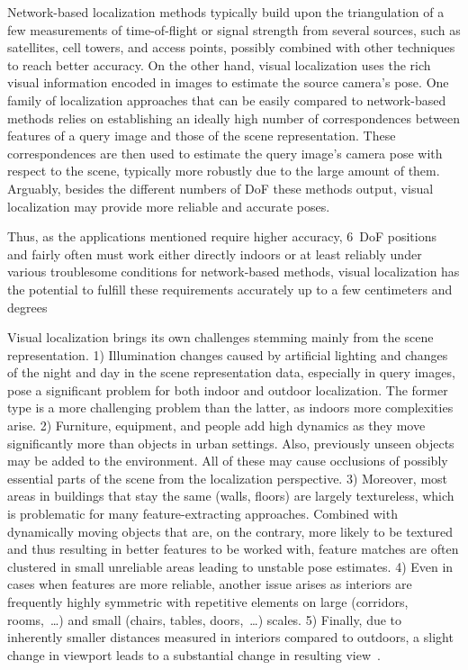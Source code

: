 Network-based localization methods typically build upon the triangulation of a few measurements
of time-of-flight or signal strength from several sources, such as satellites, cell towers,
and access points, possibly combined with other techniques to reach better accuracy.
On the other hand, visual localization uses the rich visual information encoded in images to
estimate the source camera's pose. One family of localization approaches that can be easily compared to
network-based methods relies on establishing an ideally high number of correspondences between
features of a query image and those of the scene representation. These correspondences are then
used to estimate the query image's camera pose with respect to the scene, typically more robustly
due to the large amount of them. Arguably, besides the different numbers of DoF these methods output,
visual localization may provide more reliable and accurate poses.

Thus, as the applications mentioned require higher accuracy, 6~DoF positions and fairly often
must work either directly indoors or at least reliably under various troublesome conditions for
network-based methods, visual localization has the potential to fulfill these
requirements accurately up to a few centimeters and
degrees

Visual localization brings its own challenges stemming mainly from the scene representation.
1) Illumination changes caused by artificial lighting and changes of the night and day
in the scene representation data, especially in query images, pose a significant problem
for both indoor and outdoor localization. The former type is a more challenging problem than the latter,
as indoors more complexities arise. 2) Furniture, equipment, and people add high dynamics
as they move significantly more than objects in urban settings. Also, previously unseen
objects may be added to the environment. All of these may cause
occlusions of possibly essential parts of the scene from the localization perspective. 3) Moreover, most
areas in buildings that stay the same (walls, floors) are largely textureless, which is problematic for many
feature-extracting approaches. Combined with dynamically moving objects that are, on the contrary,
more likely to be textured and thus resulting in better features to be worked with, feature
matches are often clustered in small unreliable areas leading to unstable pose estimates. 4) Even
in cases when features are more reliable, another issue arises as interiors are frequently
highly symmetric with repetitive elements on large (corridors, rooms,~\ldots) and small
(chairs, tables, doors,~\ldots) scales. 5) Finally, due to inherently smaller distances measured
in interiors compared to outdoors, a slight change in viewport leads to a substantial change in resulting
view~\citep{InLoc}.

